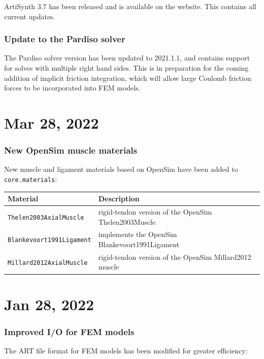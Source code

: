 \documentclass{article}
\begin{document}
ArtiSynth 3.7 has been released and is available on the website.  This
contains all current updates.

\subsubsection{Update to the Pardiso solver}

The Pardiso solver version has been updated to 2021.1.1, and contains
support for solves with multiple right hand sides. This is in
preparation for the coming addition of implicit friction integration,
which will allow large Coulomb friction forces to be incorporated into
FEM models.

\section*{Mar 28, 2022}

\subsubsection{New OpenSim muscle materials}

New muscle and ligament materials based on OpenSim have been added to
{\tt core.materials}:

\begin{center}
\begin{tabular}{|ll|}
\hline
Material & Description \\
\hline
{\tt Thelen2003AxialMuscle} & rigid-tendon version of the OpenSim
Thelen2003Muscle\\
{\tt Blankevoort1991Ligament} & implements the OpenSim 
Blankevoort1991Ligament	\\
{\tt Millard2012AxialMuscle} & rigid-tendon version of the OpenSim 
Millard2012 muscle\\
\hline
\end{tabular}
\end{center}

\section*{Jan 28, 2022}

\subsubsection{Improved I/O for FEM models}

The ART file format for FEM models has been modified for greater
efficiency:
\end{document}
